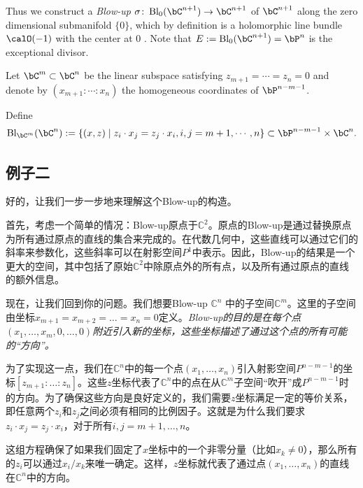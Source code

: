 \begin{example}
Thus we construct a \textit{Blow-up} $\sigma\colon \operatorname{Bl}_0 (\bC^{n+1})\to\bC^{n+1}$ of $\bC^{n+1}$ along the zero dimensional submanifold $\{0\}$, which by definition is a holomorphic line bundle $\calO(-1)$ with the center at $0$ . Note that $E:=\operatorname{Bl}_0 (\bC^{n+1})=\bP^n$ is the exceptional divisor.
\end{example}

\begin{example}
    Let $\bC^m\subset \bC^n$ be the linear subspace satisfying $z_{m+1}=\cdots=z_n=0$ and denote by $(x_{m+1}:\cdots:x_n)$ the homogeneous coordinates of $\bP^{n-m-1}$.

    Define 
    \[
        \operatorname{Bl}_{\bC^m}(\bC^n):=\{(x,z)\mid z_i\cdot x_j=z_j\cdot x_i, i,j=m+1,\cdots,n\}\subset \bP^{n-m-1}\times \bC^{n}.
    \]
\end{example}

\subsection{例子二}
好的，让我们一步一步地来理解这个Blow-up的构造。

首先，考虑一个简单的情况：Blow-up原点于$\mathbb{C}^2$。原点的Blow-up是通过替换原点为所有通过原点的直线的集合来完成的。在代数几何中，这些直线可以通过它们的斜率来参数化，这些斜率可以在射影空间$P^1$中表示。因此，Blow-up的结果是一个更大的空间，其中包括了原始$\mathbb{C}^2$中除原点外的所有点，以及所有通过原点的直线的额外信息。

现在，让我们回到你的问题。我们想要Blow-up $\mathbb{C}^n$ 中的子空间$\mathbb{C}^m$。这里的子空间由坐标$x_{m+1} = x_{m+2} = \ldots = x_n = 0$定义。\textit{Blow-up的目的是在每个点$(x_1, \ldots, x_m, 0, \ldots, 0)$附近引入新的坐标，这些坐标描述了通过这个点的所有可能的“方向”。}

为了实现这一点，我们在$\mathbb{C}^n$中的每一个点$(x_1, \ldots, x_n)$引入射影空间$P^{n-m-1}$的坐标$[z_{m+1} : \ldots : z_n]$。这些$z$坐标代表了$\mathbb{C}^n$中的点在从$\mathbb{C}^m$子空间“吹开”成$P^{n-m-1}$时的方向。为了确保这些方向是良好定义的，我们需要$z$坐标满足一定的等价关系，即任意两个$z_i$和$z_j$之间必须有相同的比例因子。这就是为什么我们要求$z_i \cdot x_j = z_j \cdot x_i$，对于所有$i,j = m+1, \ldots, n$。

这组方程确保了如果我们固定了$x$坐标中的一个非零分量（比如$x_k \neq 0$），那么所有的$z_i$可以通过$x_i/x_k$来唯一确定。这样，$z$坐标就代表了通过点$(x_1, \ldots, x_n)$的直线在$\mathbb{C}^n$中的方向。


